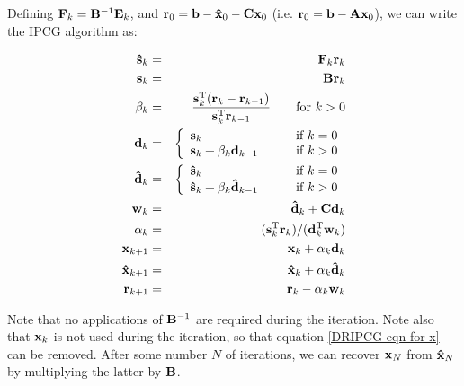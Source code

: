 \documentclass[12pt]{article}
\newcommand{\vect}[1]{{\bf #1}}                         %
\newcommand{\mat}[1]{{\bf #1}}                          %
\newcommand{\rmT}{{\rm T}}                           %
\begin{document}
Defining $\mat{F}_k = \mat{B}^{-1} \mat{E}_k$, and
$\vect{r}_0 = \vect{b} - \vect{\hat x}_0 - \mat{C}\vect{x}_0$
(i.e. $\vect{r}_0 =\vect{b} -\mat{A}\vect{x}_0$),
we can write the IPCG algorithm as:
\begin{center}
\begin{minipage}{0.8\textwidth}
\begin{eqnarray}
  \vect{\hat s}_k &=& \mat{F}_k \vect{r}_k \\
  \vect{s}_k &=& \mat{B} \vect{r}_k \\
  \beta_k &=& 
           \frac{ \vect{s}_k^\rmT (\vect{r}_k -\vect{r}_{k-1})}
                { \vect{s}_k^\rmT \vect{r}_{k-1} }
                                   \qquad\mbox{for $k>0$} \\
  \vect{d}_k &=& \left\{
       \begin{array}{ll}
           \vect{s}_k & \qquad\mbox{if $k=0$} \\
           \vect{s}_k + \beta_k \vect{d}_{k-1}
                                   & \qquad\mbox{if $k>0$}
       \end{array} \right. \\
  \vect{\hat d}_k &=& \left\{
       \begin{array}{ll}
           \vect{\hat s}_k & \qquad\mbox{if $k=0$} \\
           \vect{\hat s}_k + \beta_k \vect{\hat d}_{k-1}
                                   & \qquad\mbox{if $k>0$}
       \end{array} \right. \\
  \vect{w}_k &=& \vect{\hat d}_k + \mat{C} \vect{d}_k \\
  \alpha_k &=& (\vect{s}_k^\rmT \vect{r}_k )/(\vect{d}_k^\rmT \vect{w}_k )\\
  \label{DRIPCG-eqn-for-x}
  \vect{x}_{k+1} &=& \vect{x}_k + \alpha_k \vect{d}_k \\
  \vect{\hat x}_{k+1} &=& \vect{\hat x}_k + \alpha_k \vect{\hat d}_k \\
  \vect{r}_{k+1} &=& \vect{r}_k - \alpha_k \vect{w}_k
\end{eqnarray}
\end{minipage}
\end{center}

Note that no applications of $\mat{B}^{-1}$ are required during the
iteration. Note also that $\vect{x}_k$ is not used during the iteration,
so that equation \ref{DRIPCG-eqn-for-x} can be removed. After some number
$N$ of iterations, we can recover $\vect{x}_N$ from $\vect{\hat x}_N$ by
multiplying the latter by $\mat{B}$.
\end{document}
